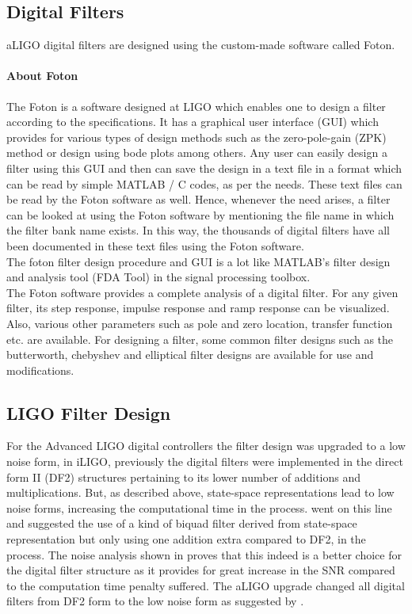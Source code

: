 \documentclass[colorlinks=true,pdfstartview=FitV,linkcolor=blue,
            citecolor=red,urlcolor=magenta]{ligodoc}
\begin{document}
	\subsection{Digital Filters}
	aLIGO digital filters are designed using the custom-made software called Foton.
	    \paragraph{About Foton}The Foton is a software designed at LIGO which enables one to design a filter according to the specifications. It has a graphical user interface (GUI) which provides for various types of design methods such as the zero-pole-gain (ZPK) method or design using bode plots among others. Any user can easily design a filter using this GUI and then can save the design in a text file in a format which can be read by simple MATLAB / C codes, as per the needs. These text files can be read by the Foton software as well. Hence, whenever the need arises, a filter can be looked at using the Foton software by mentioning the file name in which the filter bank name exists. In this way, the thousands of digital filters have all been documented in these text files using the Foton software. \\The foton filter design procedure and GUI is a lot like MATLAB's filter design and analysis tool (FDA Tool) in the signal processing toolbox. \\
	The Foton software provides a complete analysis of a digital filter. For any given filter, its step response, impulse response and ramp response can be visualized. Also, various other parameters such as pole and zero location, transfer function etc. are available. For designing a filter, some common filter designs such as the butterworth, chebyshev and elliptical filter designs are available for use and modifications. \\
    		\subsection{LIGO Filter Design}
    		
For the Advanced LIGO digital controllers the filter design was upgraded to a low noise form, in iLIGO, previously the digital filters were implemented in  the direct form II (DF2) structures pertaining to its lower number of additions and multiplications.
But, as described above, state-space representations lead to low noise forms, increasing the computational time in the process. \cite{Matts} went on this line and suggested the use of a kind of biquad filter derived from state-space representation but only using one addition extra compared to DF2, in the process. The noise analysis shown in \cite{Matts} proves that this indeed is a better choice for the digital filter structure as it provides for great increase in the SNR compared to the computation time penalty suffered. The aLIGO upgrade changed all digital filters from DF2 form to the low noise form as suggested by \cite{Matts}.
\end{document}
